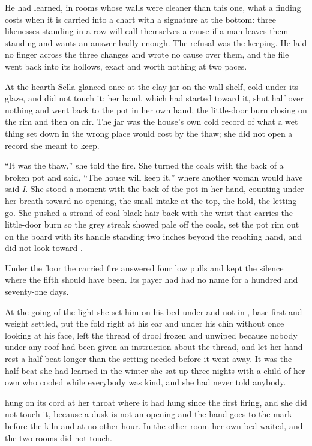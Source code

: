 He had learned, in rooms whose walls were cleaner than this one, what a finding costs when it is carried into a chart with a signature at the bottom: three likenesses standing in a row will call themselves a cause if a man leaves them standing and wants an answer badly enough. The refusal was the keeping. He laid no finger across the three changes and wrote no cause over them, and the file went back into its hollows, exact and worth nothing at two paces.

\scenebreak

At the hearth Sella glanced once at the clay jar on the wall shelf, cold under its glaze, and did not touch it; her hand, which had started toward it, shut half over nothing and went back to the pot in her own hand, the little-door burn closing on the rim and then on air. The jar was the house's own cold record of what a wet thing set down in the wrong place would cost by the thaw; she did not open a record she meant to keep.

“It was the thaw,” she told the fire. She turned the coals with the back of a broken pot and said, “The house will keep it,” where another woman would have said \emph{I}. She stood a moment with the back of the pot in her hand, counting under her breath toward no opening, the small intake at the top, the hold, the letting go. She pushed a strand of coal-black hair back with the wrist that carries the little-door burn so the grey streak showed pale off the coals, set the pot rim out on the board with its handle standing two inches beyond the reaching hand, and did not look toward .

Under the floor the carried fire answered four low pulls and kept the silence where the fifth should have been. Its payer had had no name for a hundred and seventy-one days.

At the going of the light she set him on his bed under  and not in , base first and weight settled, put the fold right at his ear and under his chin without once looking at his face, left the thread of drool frozen and unwiped because nobody under any roof had been given an instruction about the thread, and let her hand rest a half-beat longer than the setting needed before it went away. It was the half-beat she had learned in the winter she sat up three nights with a child of her own who cooled while everybody was kind, and she had never told anybody.

 hung on its cord at her throat where it had hung since the first firing, and she did not touch it, because a dusk is not an opening and the hand goes to the mark before the kiln and at no other hour. In the other room her own bed waited, and the two rooms did not touch.

